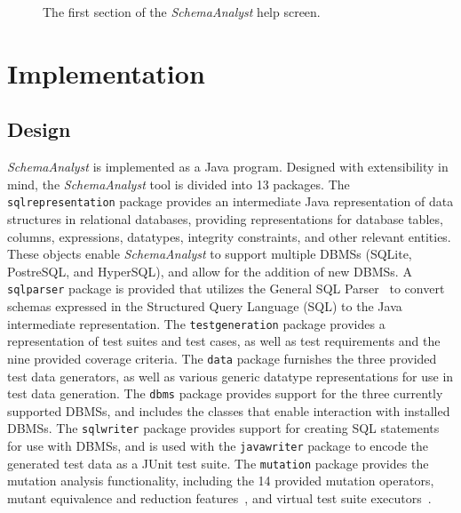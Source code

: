 \begin{figure}

\caption{\label{fig:usage} The first section of the \textit{SchemaAnalyst} help screen.}
\end{figure}

\section{Implementation}\label{sec:implementation}
\subsection{Design}
\textit{SchemaAnalyst} is implemented as a Java program.  Designed with extensibility in mind, the
\textit{SchemaAnalyst} tool is divided into 13 packages. The \texttt{sqlrepresentation} package
provides an intermediate Java representation of data structures in relational databases,
providing representations for database tables, columns, expressions, datatypes, integrity
constraints, and other relevant entities. These objects enable \textit{SchemaAnalyst} to support multiple
DBMSs (SQLite, PostreSQL, and HyperSQL), and allow for the addition of new DBMSs. A \texttt{sqlparser}
package is provided that utilizes the General SQL Parser~\cite{} to convert schemas expressed in the
Structured Query Language (SQL) to the Java intermediate representation. The \texttt{testgeneration} 
package provides a representation of test suites and test cases, as well as test requirements and the
nine provided coverage criteria. The \texttt{data} package furnishes the three provided test data generators,
as well as various generic datatype representations for use in test data generation. The \texttt{dbms} package
provides support for the three currently supported DBMSs, and includes the classes that enable interaction with
installed DBMSs. The \texttt{sqlwriter} package provides support for creating SQL statements for use
with DBMSs, and is used with the \texttt{javawriter} package to encode the generated test data as a
JUnit test suite. The \texttt{mutation} package provides the mutation analysis functionality, 
including the 14 provided mutation operators, mutant equivalence and reduction features~\cite{wright2014impact}, and virtual test suite executors~\cite{mcminn2016virtual}.

